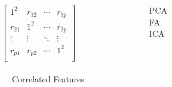 \documentclass[xcolor={dvipsnames}]{beamer}
\begin{document}
{\begin{columns}
\begin{column}{.2\textwidth}
\end{column}
\begin{column}{.3\textwidth}

\tiny

\vspace*{1.5em}

$\left[\begin{array}{cccc}
1^2 & r_{12} & \cdots &  r_{1p}\\
 r_{21} & 1^2 &  \cdots &  r_{2p}\\
\vdots & \vdots &  \ddots & \vdots \\
 r_{p1} &  r_{p2} &  \cdots & 1^2\\
\end{array}\right]$\\${}$\\

\scriptsize
$\quad\;$Correlated Features


\end{column}
\begin{column}{.15\textwidth}
\vspace*{-2em}
\begin{figure}[h!]
\large
PCA\\
FA\\
ICA\\
\end{figure}

\end{column}

\begin{column}{.1\textwidth}
\end{column}

\end{columns}


}
\end{document}
